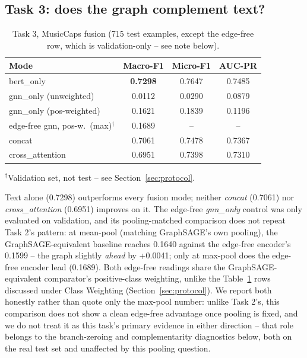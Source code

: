 \subsection{Task 3: does the graph complement text?}\label{sec:results-t3}
\begin{table}[t]
\centering
\caption{Task 3, MusicCaps fusion (715 test examples, except the edge-free row, which is
validation-only -- see note below).}
\footnotesize
\begin{tabular}{lccc}
\toprule
Mode & Macro-F1 & Micro-F1 & AUC-PR \\
\midrule
bert\_only & \textbf{0.7298} & 0.7647 & 0.7485 \\
gnn\_only (unweighted) & 0.0112 & 0.0290 & 0.0879 \\
gnn\_only (pos-weighted) & 0.1621 & 0.1839 & 0.1196 \\
edge-free gnn, pos-w.\ (max)$^{\dagger}$ & 0.1689 & -- & -- \\
concat & 0.7061 & 0.7478 & 0.7367 \\
cross\_attention & 0.6951 & 0.7398 & 0.7310 \\
\bottomrule
\end{tabular}

\vspace{2pt}
{\footnotesize $^{\dagger}$Validation set, not test -- see Section~\ref{sec:protocol}.}
\label{tab:task3-full}
\end{table}
Text alone (0.7298) outperforms every fusion mode; neither \textit{concat} (0.7061) nor
\textit{cross\_attention} (0.6951) improves on it. The edge-free \textit{gnn\_only} control
was only evaluated on validation, and its pooling-matched comparison does not repeat Task
2's pattern: at mean-pool (matching GraphSAGE's own pooling), the GraphSAGE-equivalent
baseline reaches 0.1640 against the edge-free encoder's 0.1599 -- the graph slightly
\emph{ahead} by +0.0041; only at max-pool does the edge-free encoder lead (0.1689). Both
edge-free readings share the GraphSAGE-equivalent comparator's positive-class weighting,
unlike the Table~\ref{tab:task3-full} rows discussed under Class Weighting
(Section~\ref{sec:protocol}). We report both honestly rather than quote only the max-pool
number: unlike Task 2's, this comparison does not show a clean edge-free advantage once
pooling is fixed, and we do not treat it as this task's primary evidence in either direction
-- that role belongs to the branch-zeroing and complementarity diagnostics below, both on the
real test set and unaffected by this pooling question.

